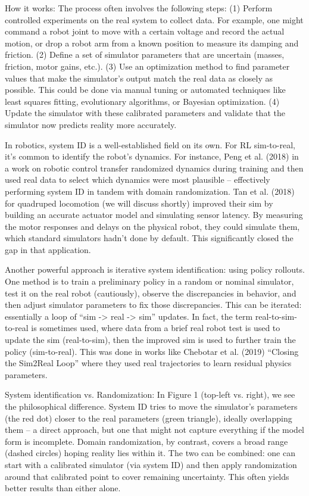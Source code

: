 How it works: The process often involves the following steps: (1) Perform controlled experiments on the real system to collect data. For example, one might command a robot joint to move with a certain voltage and record the actual motion, or drop a robot arm from a known position to measure its damping and friction. (2) Define a set of simulator parameters that are uncertain (masses, friction, motor gains, etc.). (3) Use an optimization method to find parameter values that make the simulator’s output match the real data as closely as possible. This could be done via manual tuning or automated techniques like least squares fitting, evolutionary algorithms, or Bayesian optimization. (4) Update the simulator with these calibrated parameters and validate that the simulator now predicts reality more accurately.

In robotics, system ID is a well-established field on its own. For RL sim-to-real, it’s common to identify the robot’s dynamics. For instance, Peng et al. (2018) in a work on robotic control transfer randomized dynamics during training and then used real data to select which dynamics were most plausible – effectively performing system ID in tandem with domain randomization. Tan et al. (2018) for quadruped locomotion (we will discuss shortly) improved their sim by building an accurate actuator model and simulating sensor latency. By measuring the motor responses and delays on the physical robot, they could simulate them, which standard simulators hadn’t done by default. This significantly closed the gap in that application.

Another powerful approach is iterative system identification: using policy rollouts. One method is to train a preliminary policy in a random or nominal simulator, test it on the real robot (cautiously), observe the discrepancies in behavior, and then adjust simulator parameters to fix those discrepancies. This can be iterated: essentially a loop of “sim -> real -> sim” updates. In fact, the term real-to-sim-to-real is sometimes used, where data from a brief real robot test is used to update the sim (real-to-sim), then the improved sim is used to further train the policy (sim-to-real). This was done in works like Chebotar et al. (2019) “Closing the Sim2Real Loop” where they used real trajectories to learn residual physics parameters.

System identification vs. Randomization: In Figure 1 (top-left vs. right), we see the philosophical difference. System ID tries to move the simulator’s parameters (the red dot) closer to the real parameters (green triangle), ideally overlapping them – a direct approach, but one that might not capture everything if the model form is incomplete. Domain randomization, by contrast, covers a broad range (dashed circles) hoping reality lies within it. The two can be combined: one can start with a calibrated simulator (via system ID) and then apply randomization around that calibrated point to cover remaining uncertainty. This often yields better results than either alone. 

